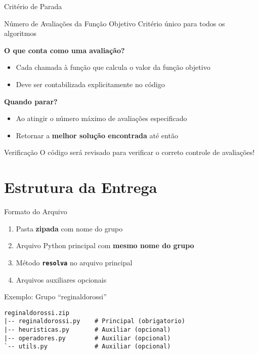 \documentclass[10pt]{beamer}
\begin{document}
\begin{frame}{Critério de Parada}
    \begin{block}{Número de Avaliações da Função Objetivo}
        Critério único para todos os algoritmos
    \end{block}
    
    \vspace{0.3cm}
    
    \textbf{O que conta como uma avaliação?}
    \begin{itemize}
        \item Cada chamada à função que calcula o valor da função objetivo
        \item Deve ser contabilizada explicitamente no código
    \end{itemize}
    
    \vspace{0.3cm}
    
    \textbf{Quando parar?}
    \begin{itemize}
        \item Ao atingir o número máximo de avaliações especificado
        \item Retornar a \textbf{melhor solução encontrada} até então
    \end{itemize}
    
    \vspace{0.3cm}
    
    \begin{alertblock}{Verificação}
        O código será revisado para verificar o correto controle de avaliações!
    \end{alertblock}
\end{frame}

\section{Estrutura da Entrega}

\begin{frame}[fragile]{Formato do Arquivo}
    \begin{enumerate}
        \item Pasta \textbf{zipada} com nome do grupo
        \item Arquivo Python principal com \textbf{mesmo nome do grupo}
        \item Método \texttt{\textbf{resolva}} no arquivo principal
        \item Arquivos auxiliares opcionais
    \end{enumerate}
    
    \vspace{0.5cm}
    
    \begin{exampleblock}{Exemplo: Grupo ``reginaldorossi''}
        \begin{verbatim}
reginaldorossi.zip
|-- reginaldorossi.py    # Principal (obrigatorio)
|-- heuristicas.py       # Auxiliar (opcional)
|-- operadores.py        # Auxiliar (opcional)
`-- utils.py             # Auxiliar (opcional)
        \end{verbatim}
    \end{exampleblock}
\end{frame}
\end{document}
